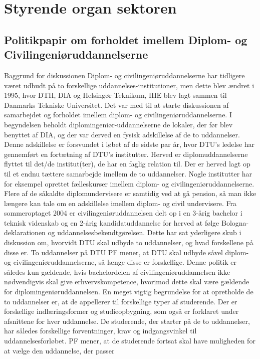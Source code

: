 \section{Styrende organ sektoren}

\subsection{Politikpapir om forholdet imellem Diplom- og Civilingeniøruddannelserne}
Baggrund for diskussionen
Diplom- og civilingeniøruddannelserne har tidligere været udbudt på to forskellige uddannelses-institutioner, men dette
blev ændret i 1995, hvor DTH, DIA og Helsingør Teknikum, IHE blev lagt sammen til Danmarks Tekniske Universitet.
Det var med til at starte diskussionen af samarbejdet og forholdet imellem diplom- og civilingeniøruddannelserne.
I begyndelsen beholdt diplomingeniør-uddannelserne de lokaler, der før blev benyttet af DIA, og der var derved en
fysisk adskillelse af de to uddannelser. Denne adskillelse er forsvundet i løbet af de sidste par år, hvor DTU’s ledelse
har gennemført en fortætning af DTU’s institutter. Herved er diplomuddannelserne flyttet til det/de institut(ter), de har
en faglig relation til. Der er herved lagt op til et endnu tættere samarbejde imellem de to uddannelser. Nogle institutter
har for eksempel oprettet fælleskurser imellem diplom- og civilingeniøruddannelserne. Flere af de såkaldte
diplomundervisere er samtidig ved at gå pension, så man ikke længere kan tale om en adskillelse imellem diplom- og
civil undervisere.
Fra sommeroptaget 2004 er civilingeniøruddannelsen delt op i en 3-årig bachelor i teknisk videnskab og en 2-årig
kandidatuddannelse for herved at følge Bologna-deklarationen og uddannelsesbekendtgørelsen. Dette har sat yderligere
skub i diskussion om, hvorvidt DTU skal udbyde to uddannelser, og hvad forskellene på disse er.
To uddannelser på DTU
PF mener, at DTU skal udbyde såvel diplom- og civilingeniøruddannelserne, så længe disse er forskellige. Denne
politik er således kun gældende, hvis bachelordelen af civilingeniøruddannelsen ikke nødvendigvis skal give
erhvervskompetence, hvorimod dette skal være gældende for diplomingeniøruddannelsen.
En meget vigtig begrundelse for at opretholde de to uddannelser er, at de appellerer til forskellige typer af studerende.
Der er forskellige indlæringsformer og studieopbygning, som også er forklaret under afsnittene for hver uddannelse. De
studerende, der starter på de to uddannelser, har således forskellige forventninger, krav og indgangsvinkel til
uddannelsesforløbet. PF mener, at de studerende fortsat skal have muligheden for at vælge den uddannelse, der passer
